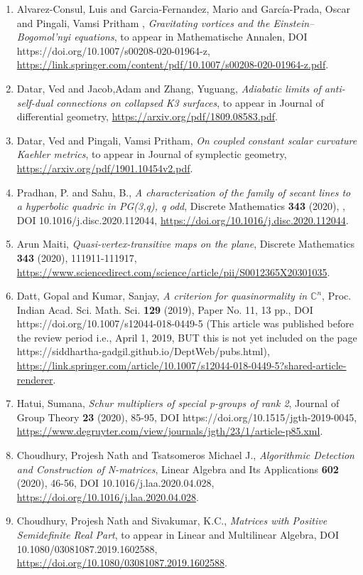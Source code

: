 \begin{enumerate}
\item Alvarez-Consul, Luis and Garcia-Fernandez, Mario  and García-Prada, Oscar and Pingali, Vamsi Pritham , \emph{Gravitating vortices and the Einstein–Bogomol’nyi equations}, to appear in Mathematische Annalen, DOI https://doi.org/10.1007/s00208-020-01964-z, \url{https://link.springer.com/content/pdf/10.1007/s00208-020-01964-z.pdf}.
\item Datar, Ved and Jacob,Adam and Zhang, Yuguang, \emph{Adiabatic limits of anti-self-dual connections on collapsed K3 surfaces}, to appear in Journal of differential geometry, \url{https://arxiv.org/pdf/1809.08583.pdf}.
\item Datar, Ved and Pingali, Vamsi Pritham, \emph{On coupled constant scalar curvature Kaehler metrics}, to appear in Journal of symplectic geometry, \url{https://arxiv.org/pdf/1901.10454v2.pdf}.
\item Pradhan, P. and Sahu, B., \emph{A characterization of the family of secant lines to a hyperbolic quadric in PG(3,q), q odd}, Discrete Mathematics {\bf 343} (2020), , DOI 10.1016/j.disc.2020.112044, \url{https://doi.org/10.1016/j.disc.2020.112044}.
\item Arun Maiti, \emph{Quasi-vertex-transitive maps on the plane}, Discrete Mathematics {\bf 343} (2020), 111911-111917, \url{https://www.sciencedirect.com/science/article/pii/S0012365X20301035}.
\item Datt, Gopal and Kumar, Sanjay, \emph{A criterion for quasinormality in $\mathbb{C}^n$},  Proc. Indian Acad. Sci. Math. Sci. {\bf 129} (2019), Paper No. 11, 13 pp., DOI https://doi.org/10.1007/s12044-018-0449-5     (This article was published before the review period i.e., April 1, 2019, BUT this is not yet included on the page  https://siddhartha-gadgil.github.io/DeptWeb/pubs.html), \url{https://link.springer.com/article/10.1007/s12044-018-0449-5?shared-article-renderer}.
\item Hatui, Sumana, \emph{Schur multipliers of special p-groups of rank 2}, Journal of Group Theory {\bf 23} (2020), 85-95, DOI https://doi.org/10.1515/jgth-2019-0045, \url{https://www.degruyter.com/view/journals/jgth/23/1/article-p85.xml}.
\item Choudhury, Projesh Nath and Tsatsomeros Michael J., \emph{Algorithmic Detection and Construction of N-matrices}, Linear Algebra and Its Applications {\bf 602} (2020), 46-56, DOI 10.1016/j.laa.2020.04.028, \url{https://doi.org/10.1016/j.laa.2020.04.028}.
\item Choudhury, Projesh Nath and Sivakumar, K.C., \emph{Matrices with Positive Semidefinite Real Part}, to appear in Linear and Multilinear Algebra, DOI 10.1080/03081087.2019.1602588, \url{https://doi.org/10.1080/03081087.2019.1602588}.

\end{enumerate}
